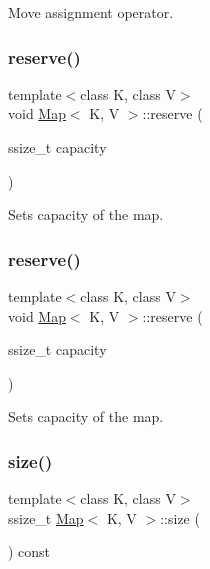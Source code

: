 Move assignment operator. \mbox{\label{classMap_a13b7b471133038741b63494407300df4}} 
\subsubsection{\texorpdfstring{reserve()}{reserve()}\hspace{0.1cm}{\footnotesize\ttfamily [1/2]}}
{\footnotesize\ttfamily template$<$class K, class V$>$ \\
void \hyperlink{classMap}{Map}$<$ K, V $>$\+::reserve (\begin{DoxyParamCaption}\item[{ssize\+\_\+t}]{capacity }\end{DoxyParamCaption})\hspace{0.3cm}{\ttfamily [inline]}}

Sets capacity of the map. \mbox{\label{classMap_a13b7b471133038741b63494407300df4}} 
\subsubsection{\texorpdfstring{reserve()}{reserve()}\hspace{0.1cm}{\footnotesize\ttfamily [2/2]}}
{\footnotesize\ttfamily template$<$class K, class V$>$ \\
void \hyperlink{classMap}{Map}$<$ K, V $>$\+::reserve (\begin{DoxyParamCaption}\item[{ssize\+\_\+t}]{capacity }\end{DoxyParamCaption})\hspace{0.3cm}{\ttfamily [inline]}}

Sets capacity of the map. \mbox{\label{classMap_a69c355a6d393f859d830ddb3e476c8ec}} 
\subsubsection{\texorpdfstring{size()}{size()}\hspace{0.1cm}{\footnotesize\ttfamily [1/2]}}
{\footnotesize\ttfamily template$<$class K, class V$>$ \\
ssize\+\_\+t \hyperlink{classMap}{Map}$<$ K, V $>$\+::size (\begin{DoxyParamCaption}{ }\end{DoxyParamCaption}) const\hspace{0.3cm}{\ttfamily [inline]}}

